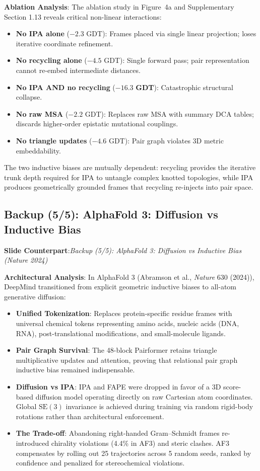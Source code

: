 \documentclass[10pt,a4paper]{article}
\newcommand{\SE}{\mathrm{SE}(3)}
\begin{document}
\textbf{Ablation Analysis}:
The ablation study in Figure~4a and Supplementary Section 1.13 reveals critical non-linear interactions:
\begin{itemize}\setlength{\itemsep}{1.2mm}
  \item \textbf{No IPA alone} ($-2.3$ GDT): Frames placed via single linear projection; loses iterative coordinate refinement.
  \item \textbf{No recycling alone} ($-4.5$ GDT): Single forward pass; pair representation cannot re-embed intermediate distances.
  \item \textbf{No IPA AND no recycling} ($\bm{-16.3}$ \textbf{GDT}): Catastrophic structural collapse.
  \item \textbf{No raw MSA} ($-2.2$ GDT): Replaces raw MSA with summary DCA tables; discards higher-order epistatic mutational couplings.
  \item \textbf{No triangle updates} ($-4.6$ GDT): Pair graph violates 3D metric embeddability.
\end{itemize}
The two inductive biases are mutually dependent: recycling provides the iterative trunk depth required for IPA to untangle complex knotted topologies, while IPA produces geometrically grounded frames that recycling re-injects into pair space.

\subsection{Backup (5/5): AlphaFold 3: Diffusion vs Inductive Bias}
\textbf{Slide Counterpart}:\enspace \textsl{Backup (5/5): AlphaFold 3: Diffusion vs Inductive Bias (Nature 2024)}

\textbf{Architectural Analysis}:
In AlphaFold 3 (Abramson et al., \textit{Nature} 630 (2024)), DeepMind transitioned from explicit geometric inductive biases to all-atom generative diffusion:
\begin{itemize}\setlength{\itemsep}{1.2mm}
  \item \textbf{Unified Tokenization}: Replaces protein-specific residue frames with universal chemical tokens representing amino acids, nucleic acids (DNA, RNA), post-translational modifications, and small-molecule ligands.
  \item \textbf{Pair Graph Survival}: The 48-block Pairformer retains triangle multiplicative updates and attention, proving that relational pair graph inductive bias remained indispensable.
  \item \textbf{Diffusion vs IPA}: IPA and FAPE were dropped in favor of a 3D score-based diffusion model operating directly on raw Cartesian atom coordinates. Global $\SE$ invariance is achieved during training via random rigid-body rotations rather than architectural enforcement.
  \item \textbf{The Trade-off}: Abandoning right-handed Gram--Schmidt frames re-introduced chirality violations (4.4\% in AF3) and steric clashes. AF3 compensates by rolling out 25 trajectories across 5 random seeds, ranked by confidence and penalized for stereochemical violations.
\end{itemize}
\end{document}
